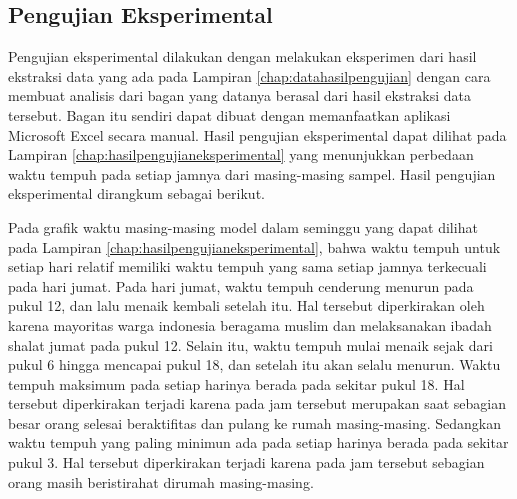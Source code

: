 \subsection{Pengujian Eksperimental}
\label{subsec:pengujianeksperimental}
Pengujian eksperimental dilakukan dengan melakukan eksperimen dari hasil ekstraksi data yang ada pada Lampiran \ref{chap:datahasilpengujian} dengan cara membuat analisis dari bagan yang datanya berasal dari hasil ekstraksi data tersebut. Bagan itu sendiri dapat dibuat dengan memanfaatkan aplikasi Microsoft Excel secara manual. Hasil pengujian eksperimental dapat dilihat pada Lampiran \ref{chap:hasilpengujianeksperimental} yang menunjukkan perbedaan waktu tempuh pada setiap jamnya dari masing-masing sampel. Hasil pengujian eksperimental dirangkum sebagai berikut.

Pada grafik waktu masing-masing model dalam seminggu yang dapat dilihat pada Lampiran \ref{chap:hasilpengujianeksperimental}, bahwa waktu tempuh untuk setiap hari relatif memiliki waktu tempuh yang sama setiap jamnya terkecuali pada hari jumat. Pada hari jumat, waktu tempuh cenderung menurun pada pukul 12, dan lalu menaik kembali setelah itu. Hal tersebut diperkirakan oleh karena mayoritas warga indonesia beragama muslim dan melaksanakan ibadah shalat jumat pada pukul 12. Selain itu, waktu tempuh mulai menaik sejak dari pukul 6 hingga mencapai pukul 18, dan setelah itu akan selalu menurun. Waktu tempuh maksimum pada setiap harinya berada pada sekitar pukul 18. Hal tersebut diperkirakan terjadi karena pada jam tersebut merupakan saat sebagian besar orang selesai beraktifitas dan pulang ke rumah masing-masing. Sedangkan waktu tempuh yang paling minimun ada pada setiap harinya berada pada sekitar pukul 3. Hal tersebut diperkirakan terjadi karena pada jam tersebut sebagian orang masih beristirahat dirumah masing-masing.